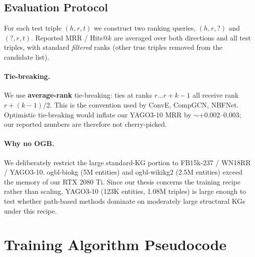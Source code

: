 \subsection{Evaluation Protocol}
For each test triple $(h, r, t)$ we construct two ranking queries, $(h, r, ?)$ and $(?, r, t)$.
Reported MRR / Hits@$k$ are averaged over both directions and all test triples, with standard \emph{filtered} ranks (other true triples removed from the candidate list).

\paragraph{Tie-breaking.}
We use \textbf{average-rank} tie-breaking: ties at ranks $r \ldots r+k-1$ all receive rank $r + (k-1)/2$.
This is the convention used by ConvE, CompGCN, NBFNet.
Optimistic tie-breaking would inflate our YAGO3-10 MRR by $\sim$+0.002--0.003; our reported numbers are therefore not cherry-picked.

\paragraph{Why no OGB.}
We deliberately restrict the large standard-KG portion to FB15k-237 / WN18RR / YAGO3-10. ogbl-biokg (5M entities) and ogbl-wikikg2 (2.5M entities) exceed the memory of our RTX 2080 Ti. Since our thesis concerns the training recipe rather than scaling, YAGO3-10 (123K entities, 1.08M triples) is large enough to test whether path-based methods dominate on moderately large structural KGs under this recipe.

\section{Training Algorithm Pseudocode}
\label{app:algorithm}

